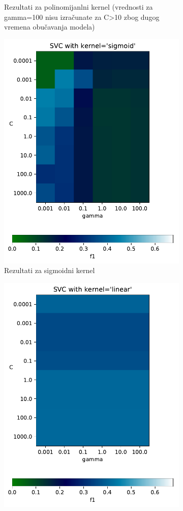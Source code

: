 \documentclass[a4paper]{article}
\begin{document}
\begin{figure}
\begin{subfigure}{.5\textwidth}
		\caption{Rezultati za polinomijanlni kernel (vrednosti za gamma=100 nisu izračunate za C>10 zbog dugog vremena obučavanja modela)}
		\label{fig:sub2}
	\end{subfigure}
	\begin{subfigure}{.5\textwidth}
		\centering
		\includegraphics[width=.8\linewidth]{images/SVC_kernel_sigmoid.pdf}
		\caption{Rezultati za sigmoidni kernel \hfill \break\hfill \break\hfill \break}
		\label{fig:sub3}
	\end{subfigure}%
	\begin{subfigure}{.5\textwidth}
		\centering
		\includegraphics[width=.8\linewidth]{images/SVC_kernel_linear.pdf}

\end{subfigure}
\end{figure}
\end{document}
